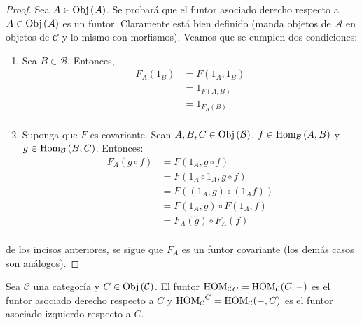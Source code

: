 \documentclass[12pt]{report}
\newcounter{it}
\theoremstyle{largebreak}
\newcommand{\Obj}[1]{\ensuremath{\textup{Obj}\left(#1\right)}}
\newcommand{\Hom}[3]{\ensuremath{\textup{Hom}_{#1}\left(#2,#3\right)}}
\begin{document}
    \begin{proof}
        Sea $A\in\Obj{\mathcal{A}}$. Se probará que el funtor asociado derecho respecto a $A\in\Obj{\mathcal{A}}$ es un funtor. Claramente está bien definido (manda objetos de $\mathcal{A}$ en objetos de $\mathcal{C}$ y lo mismo con morfismos). Veamos que se cumplen dos condiciones:
        \begin{enumerate}
            \item Sea $B\in\mathcal{B}$. Entonces,
            \begin{equation*}
                \begin{split}
                    F_A(1_B)&=F(1_A,1_B)\\
                    &=1_{F(A,B)}\\
                    &=1_{F_A(B)}\\
                \end{split}
            \end{equation*}
            \item Suponga que $F$ es covariante. Sean $A,B,C\in\Obj{\mathcal{B}}$, $f\in\Hom{\mathcal{B}}{A}{B}$ y $g\in\Hom{\mathcal{B}}{B}{C}$. Entonces:
            \begin{equation*}
                \begin{split}
                    F_A(g\circ f)&=F(1_A,g\circ f)\\
                    &=F(1_A\circ 1_A,g\circ f)\\
                    &=F((1_A,g)\circ(1_A f))\\
                    &=F(1_A,g)\circ F(1_A,f)\\
                    &=F_A(g)\circ F_A(f)\\
                \end{split}
            \end{equation*}
        \end{enumerate}
        de los incisos anteriores, se sigue que $F_A$ es un funtor covariante (los demás casos son análogos).
    \end{proof}

    \begin{exa}
        Sea $\mathcal{C}$ una categoría  y $C\in\Obj{\mathcal{C}}$. El funtor ${\textup{HOM}_{\mathcal{C}}}_C=\textup{HOM}_{\mathcal{C}}(C,-)$ es el funtor asociado derecho respecto a $C$ y ${\textup{HOM}_{\mathcal{C}}}^C=\textup{HOM}_{\mathcal{C}}(-,C)$ es el funtor asociado izquierdo respecto a $C$.
    \end{exa}
\end{document}
